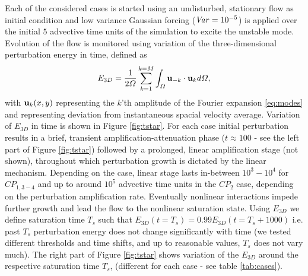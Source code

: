 \documentclass[lineno]{jfm}
\DeclareMathOperator{\Var}{\it Var}
\begin{document}
Each of the considered cases is started using an undisturbed, stationary flow as initial condition and low variance Gaussian forcing (${\Var}=10^{-5}$) is applied over the initial $5$ advective time units of the simulation to excite the unstable mode. Evolution of the flow is monitored using variation of the three-dimensional perturbation energy in time, defined as
\begin{equation}
E_{3D}=\frac{1}{2\Omega}\sum_{k=1}^{k=M} \int_\Omega {\bf u}_{-k}\cdot{\bf u}_kd\Omega,
\label{eq:e3d}
\end{equation}
with ${\bf u}_k(x,y)$ representing the $k$'th amplitude of the Fourier expansion \eqref{eq:modes}
and representing deviation from instantaneous spacial velocity average.
Variation of $E_{3D}$ in time is shown in Figure \ref{fig:tstar}.
For each case initial perturbation results in a brief, transient amplification-attenuation phase ($t\approx100$ - see the left part of Figure \ref{fig:tstar}) followed by a prolonged, linear amplification stage (not shown), throughout which perturbation growth is dictated by the linear mechanism.
Depending on the case, linear stage lasts in-between $10^3-10^4$ for $CP_{1,3-4}$ and up to around $10^5$ advective time units in the $CP_2$ case, depending on the perturbation amplification rate.
Eventually nonlinear interactions impede further growth and lead the flow to the nonlinear saturation state.
Using $E_{3D}$ we define saturation time $T_s$ such that $E_{3D}(t=T_s)=0.99 E_{3D}(t=T_s+1000)$
i.e. past $T_s$ perturbation energy does not change significantly with time (we tested different thresholds and time shifts, and up to reasonable values, $T_s$ does not vary much).
The right part of Figure \ref{fig:tstar} shows variation of the $E_{3D}$ around the respective saturation time $T_s$, (different for each case - see table \ref{tab:cases}).

\end{document}
